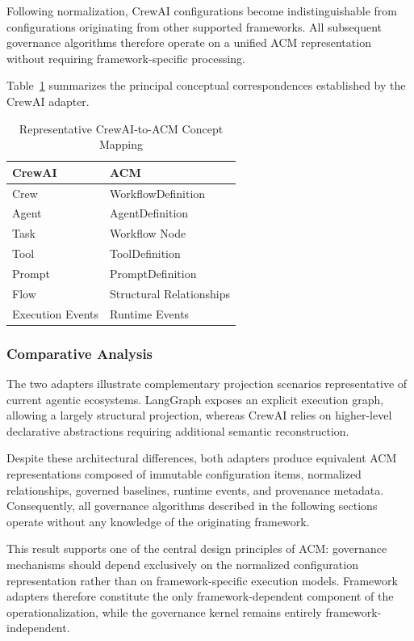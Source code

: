 \documentclass[10pt]{article}
\begin{document}
Following normalization, CrewAI configurations become indistinguishable from configurations originating from other supported frameworks. All subsequent governance algorithms therefore operate on a unified ACM representation without requiring framework-specific processing.

Table~\ref{tab:crewai_mapping} summarizes the principal conceptual correspondences established by the CrewAI adapter.

\begin{table}[ht]
\centering
\caption{Representative CrewAI-to-ACM Concept Mapping}
\label{tab:crewai_mapping}
\begin{tabular}{ll}
\toprule
\textbf{CrewAI} & \textbf{ACM} \\
\midrule
Crew & WorkflowDefinition \\
Agent & AgentDefinition \\
Task & Workflow Node \\
Tool & ToolDefinition \\
Prompt & PromptDefinition \\
Flow & Structural Relationships \\
Execution Events & Runtime Events \\
\bottomrule
\end{tabular}
\end{table}

\subsubsection{Comparative Analysis}

The two adapters illustrate complementary projection scenarios representative of current agentic ecosystems. LangGraph exposes an explicit execution graph, allowing a largely structural projection, whereas CrewAI relies on higher-level declarative abstractions requiring additional semantic reconstruction.

Despite these architectural differences, both adapters produce equivalent ACM representations composed of immutable configuration items, normalized relationships, governed baselines, runtime events, and provenance metadata. Consequently, all governance algorithms described in the following sections operate without any knowledge of the originating framework.

This result supports one of the central design principles of ACM: governance mechanisms should depend exclusively on the normalized configuration representation rather than on framework-specific execution models. Framework adapters therefore constitute the only framework-dependent component of the operationalization, while the governance kernel remains entirely framework-independent.
\end{document}
